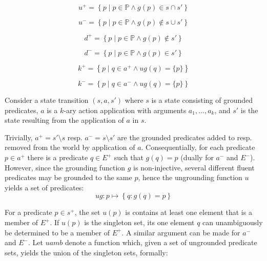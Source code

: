 \documentclass[../Master.tex]{subfiles}
\begin{document}
 

\begin{equation}
    u^+ = \left\{
        p \; | \; p \in \mathbb{P} \land g(p) \in s \cap s'
    \right\}
\end{equation}

\begin{equation}
    u^- = \left\{
        p \; | \; p \in \mathbb{P} \land g(p) \notin s \cup s'
    \right\}
\end{equation}

\begin{equation}
    d^+ = \left\{
        p \; | \; p \in \mathbb{P} \land g(p) \notin s'
    \right\}
\end{equation}

\begin{equation}
    d^- = \left\{
        p \; | \; p \in \mathbb{P} \land g(p) \in s'
    \right\}
\end{equation}

\begin{equation}
    k^+ = \left\{
        p \; | \; q \in a^+ \land ug(q) = \{ p \}
    \right\}
\end{equation}

\begin{equation}
    k^- = \left\{
        p \; | \; q \in a^- \land ug(q) = \{ p \}
    \right\}
\end{equation}

    Consider a state transition $\left(s,a,s'\right)$ where $s$ is a
state consisting of grounded predicates, $a$ is a $k$-ary action
application with arguments $a_{1},\dots,a_{k}$, and $s'$ is the
state resulting from the application of $a$ in $s$.

Trivially, $a^{+}=s'\setminus s$ resp. $a^{-}=s\setminus s'$ are
the grounded predicates added to resp. removed from the world by application
of $a$. Consequentially, for each predicate $p\in a^{+}$ there is
a predicate $q\in E^{+}$ such that $g\left(q\right)=p$ (dually for
$a^{-}$ and $E^{-}$). However, since the grounding function $g$
is non-injective, several different fluent predicates may be grounded
to the same $p$, hence the ungrounding function $u$ yields a set
of predicates:
\[
ug:p\mapsto\left\{ q:g\left(q\right)=p\right\}
\]


For a predicate $p\in s^{+}$, the set $u\left(p\right)$ is contains
at least one element that is a member of $E^{+}$. If $u\left(p\right)$
is the singleton set, its one element $q$ can unambiguously be determined
to be a member of $E^{+}$. A similar argument can be made for $a^{-}$
and $E^{-}$. Let $uamb$ denote a function which, given a set of
ungrounded predicate sets, yields the union of the singleton sets,
formally:
\end{document}
